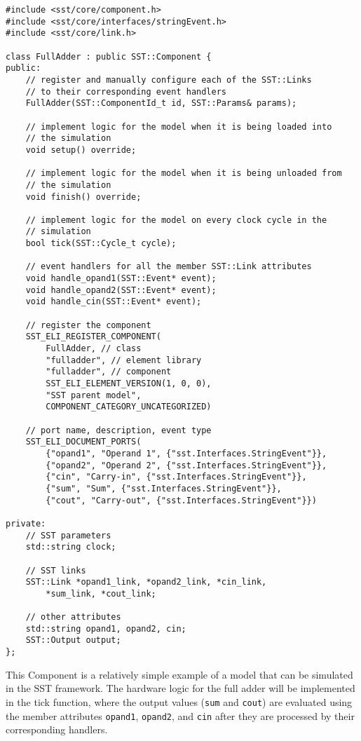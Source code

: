\begin{lstlisting}[style=customC++]
#include <sst/core/component.h>
#include <sst/core/interfaces/stringEvent.h>
#include <sst/core/link.h>

class FullAdder : public SST::Component {
public:
    // register and manually configure each of the SST::Links
    // to their corresponding event handlers
    FullAdder(SST::ComponentId_t id, SST::Params& params);

    // implement logic for the model when it is being loaded into
    // the simulation
    void setup() override;

    // implement logic for the model when it is being unloaded from
    // the simulation
    void finish() override;

    // implement logic for the model on every clock cycle in the
    // simulation
    bool tick(SST::Cycle_t cycle);

    // event handlers for all the member SST::Link attributes
    void handle_opand1(SST::Event* event);
    void handle_opand2(SST::Event* event);
    void handle_cin(SST::Event* event);

    // register the component
    SST_ELI_REGISTER_COMPONENT(
        FullAdder, // class
        "fulladder", // element library
        "fulladder", // component
        SST_ELI_ELEMENT_VERSION(1, 0, 0),
        "SST parent model",
        COMPONENT_CATEGORY_UNCATEGORIZED)

    // port name, description, event type
    SST_ELI_DOCUMENT_PORTS(
        {"opand1", "Operand 1", {"sst.Interfaces.StringEvent"}},
        {"opand2", "Operand 2", {"sst.Interfaces.StringEvent"}},
        {"cin", "Carry-in", {"sst.Interfaces.StringEvent"}},
        {"sum", "Sum", {"sst.Interfaces.StringEvent"}},
        {"cout", "Carry-out", {"sst.Interfaces.StringEvent"}})

private:
    // SST parameters
    std::string clock;

    // SST links
    SST::Link *opand1_link, *opand2_link, *cin_link, 
        *sum_link, *cout_link;

    // other attributes
    std::string opand1, opand2, cin;
    SST::Output output;
};
\end{lstlisting}

This Component is a relatively simple example of a model that can be simulated in the SST framework. The hardware logic for the full adder will be implemented in the tick function, where the output values (\texttt{sum} and \texttt{cout}) are evaluated using the member attributes \texttt{opand1}, \texttt{opand2}, and \texttt{cin} after they are processed by their corresponding handlers.

